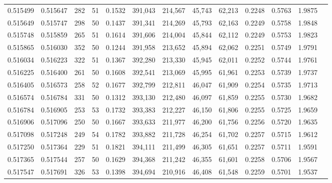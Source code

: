 \begin{tabular}{rrrrrrrrrrrrr}
0.515499 & 0.515647 &   282 &  51 &                                     0.1532 & 391,043 & 214,567 &  45,743 &  62,213 & 0.2248 & 0.5763 & 1.9875 \\
0.515649 & 0.515747 &   298 &  50 &                                     0.1437 & 391,341 & 214,269 &  45,793 &  62,163 & 0.2249 & 0.5758 & 1.9848 \\
0.515748 & 0.515859 &   265 &  51 &                                     0.1614 & 391,606 & 214,004 &  45,844 &  62,112 & 0.2249 & 0.5753 & 1.9823 \\
0.515865 & 0.516030 &   352 &  50 &                                     0.1244 & 391,958 & 213,652 &  45,894 &  62,062 & 0.2251 & 0.5749 & 1.9791 \\
0.516034 & 0.516223 &   322 &  51 &                                     0.1367 & 392,280 & 213,330 &  45,945 &  62,011 & 0.2252 & 0.5744 & 1.9761 \\
0.516225 & 0.516400 &   261 &  50 &                                     0.1608 & 392,541 & 213,069 &  45,995 &  61,961 & 0.2253 & 0.5739 & 1.9737 \\
0.516405 & 0.516573 &   258 &  52 &                                     0.1677 & 392,799 & 212,811 &  46,047 &  61,909 & 0.2254 & 0.5735 & 1.9713 \\
0.516574 & 0.516784 &   331 &  50 &                                     0.1312 & 393,130 & 212,480 &  46,097 &  61,859 & 0.2255 & 0.5730 & 1.9682 \\
0.516784 & 0.516905 &   253 &  53 &                                     0.1732 & 393,383 & 212,227 &  46,150 &  61,806 & 0.2255 & 0.5725 & 1.9659 \\
0.516906 & 0.517096 &   250 &  50 &                                     0.1667 & 393,633 & 211,977 &  46,200 &  61,756 & 0.2256 & 0.5720 & 1.9635 \\
0.517098 & 0.517248 &   249 &  54 &                                     0.1782 & 393,882 & 211,728 &  46,254 &  61,702 & 0.2257 & 0.5715 & 1.9612 \\
0.517250 & 0.517364 &   229 &  51 &                                     0.1821 & 394,111 & 211,499 &  46,305 &  61,651 & 0.2257 & 0.5711 & 1.9591 \\
0.517365 & 0.517544 &   257 &  50 &                                     0.1629 & 394,368 & 211,242 &  46,355 &  61,601 & 0.2258 & 0.5706 & 1.9567 \\
0.517547 & 0.517691 &   326 &  53 &                                     0.1398 & 394,694 & 210,916 &  46,408 &  61,548 & 0.2259 & 0.5701 & 1.9537 \\

\end{tabular}

